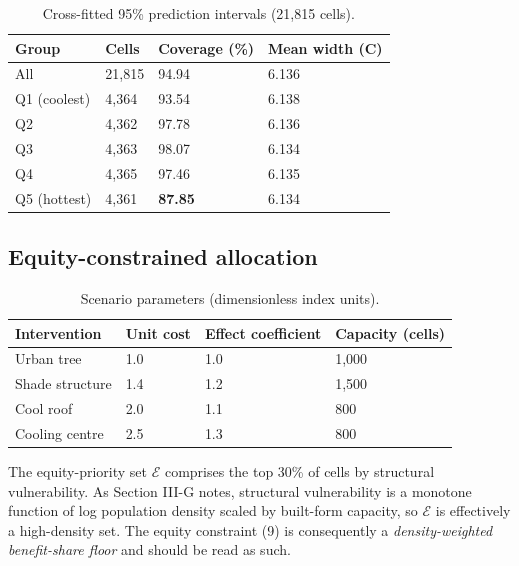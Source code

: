 \begin{table}[!t]
\caption{Cross-fitted 95\% prediction intervals (21,815 cells).}
\label{tab:4}
\centering
\footnotesize
\begin{tabular}{@{}llll@{}}
\toprule\noalign{}
Group & Cells & Coverage (\%) & Mean width (\textdegree{}C) \\
\midrule\noalign{}
All & 21,815 & 94.94 & 6.136 \\
Q1 (coolest) & 4,364 & 93.54 & 6.138 \\
Q2 & 4,362 & 97.78 & 6.136 \\
Q3 & 4,363 & 98.07 & 6.134 \\
Q4 & 4,365 & 97.46 & 6.135 \\
Q5 (hottest) & 4,361 & \textbf{87.85} & 6.134 \\
\end{tabular}
\end{table}


\subsection{Equity-constrained allocation}\label{e.-equity-constrained-allocation}

\begin{table}[!t]
\caption{Scenario parameters (dimensionless index units).}
\label{tab:5}
\centering
\footnotesize
\begin{tabular}{@{}llll@{}}
\toprule\noalign{}
Intervention & Unit cost & Effect coefficient & Capacity (cells) \\
\midrule\noalign{}
Urban tree & 1.0 & 1.0 & 1,000 \\
Shade structure & 1.4 & 1.2 & 1,500 \\
Cool roof & 2.0 & 1.1 & 800 \\
Cooling centre & 2.5 & 1.3 & 800 \\
\end{tabular}
\end{table}


The equity-priority set \(\mathcal{E}\) comprises the top 30\% of cells by structural vulnerability. As
Section III-G notes, structural vulnerability is a monotone function of log population density scaled
by built-form capacity, so \(\mathcal{E}\) is effectively a high-density set. The equity constraint (9)
is consequently a \emph{density-weighted benefit-share floor} and should be read as such.

